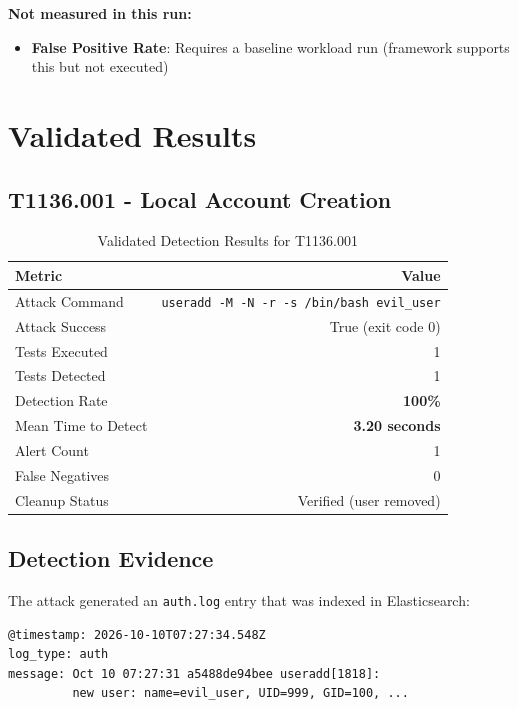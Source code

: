 \documentclass[11pt,a4paper]{article}
\begin{document}
\textbf{Not measured in this run:}
\begin{itemize}
    \item \textbf{False Positive Rate}: Requires a baseline workload run (framework supports this but not executed)
\end{itemize}

\section{Validated Results}

\subsection{T1136.001 - Local Account Creation}

\begin{table}[H]
    \centering
    \caption{Validated Detection Results for T1136.001}
    \begin{tabular}{lr}
        \toprule
        \textbf{Metric} & \textbf{Value} \\
        \midrule
        Attack Command & \texttt{useradd -M -N -r -s /bin/bash evil\_user} \\
        Attack Success & True (exit code 0) \\
        Tests Executed & 1 \\
        Tests Detected & 1 \\
        Detection Rate & \textbf{100\%} \\
        Mean Time to Detect & \textbf{3.20 seconds} \\
        Alert Count & 1 \\
        False Negatives & 0 \\
        Cleanup Status & Verified (user removed) \\
        \bottomrule
    \end{tabular}
\end{table}

\subsection{Detection Evidence}

The attack generated an \texttt{auth.log} entry that was indexed in Elasticsearch:

\begin{verbatim}
@timestamp: 2026-10-10T07:27:34.548Z
log_type: auth
message: Oct 10 07:27:31 a5488de94bee useradd[1818]:
         new user: name=evil_user, UID=999, GID=100, ...
\end{verbatim}
\end{document}
